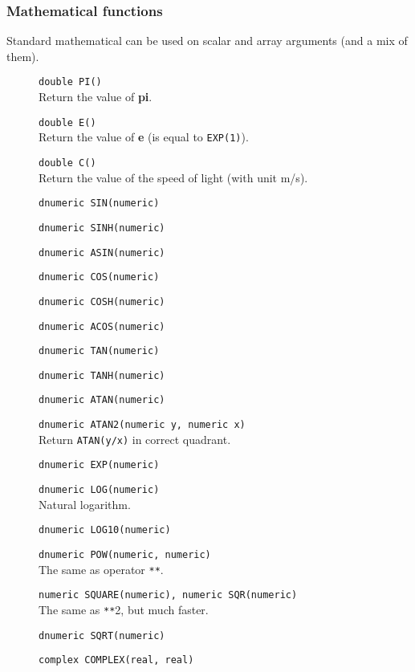 \subsubsection{Mathematical functions}
Standard mathematical can be used on scalar and array arguments (and a mix of them).
\begin{description}
  \item[] \texttt{double PI()}\\
    Return the value of \textbf{pi}.
  \item[] \texttt{double E()}\\
    Return the value of \textbf{e} (is equal to \texttt{EXP(1)}).
  \item[] \texttt{double C()}\\
    Return the value of the speed of light (with unit m/s).
  \item[] \texttt{dnumeric SIN(numeric)}
  \item[] \texttt{dnumeric SINH(numeric)}
  \item[] \texttt{dnumeric ASIN(numeric)}
  \item[] \texttt{dnumeric COS(numeric)}
  \item[] \texttt{dnumeric COSH(numeric)}
  \item[] \texttt{dnumeric ACOS(numeric)}
  \item[] \texttt{dnumeric TAN(numeric)}
  \item[] \texttt{dnumeric TANH(numeric)}
  \item[] \texttt{dnumeric ATAN(numeric)}
  \item[] \texttt{dnumeric ATAN2(numeric y, numeric x)}\\
    Return \texttt{ATAN(y/x)} in correct quadrant.
  \item[] \texttt{dnumeric EXP(numeric)}
  \item[] \texttt{dnumeric LOG(numeric)}\\
    Natural logarithm.
  \item[] \texttt{dnumeric LOG10(numeric)}
  \item[] \texttt{dnumeric POW(numeric, numeric)}\\
    The same as operator \verb+**+.
  \item[] \texttt{numeric SQUARE(numeric),  numeric SQR(numeric)}\\
    The same as \verb+**+2, but much faster.
  \item[] \texttt{dnumeric SQRT(numeric)}
  \item[] \texttt{complex COMPLEX(real, real)}

\end{description}
